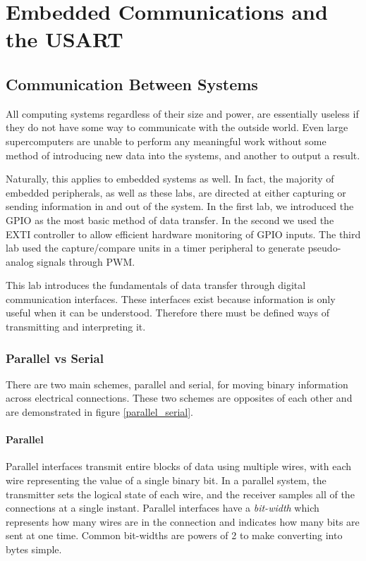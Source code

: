 \documentclass[11pt,fleqn]{book} %
\begin{document}
	
\chapter{Embedded Communications and the USART}

\section{Communication Between Systems}
All computing systems regardless of their size and power, are essentially useless if they do not have some way to communicate with the outside world. Even large supercomputers are unable to perform any meaningful work without some method of introducing new data into the systems, and another to output a result. 

Naturally, this applies to embedded systems as well. In fact, the majority of embedded peripherals, as well as these labs, are directed at either capturing or sending information in and out of the system. In the first lab, we introduced the GPIO as the most basic method of data transfer. In the second we used the EXTI controller to allow efficient hardware monitoring of GPIO inputs. The third lab used the capture/compare units in a timer peripheral to generate pseudo-analog signals through PWM. 

This lab introduces the fundamentals of data transfer through digital communication interfaces. These interfaces exist because information is only useful when it can be understood. Therefore there must be defined ways of transmitting and interpreting it.

\subsection{Parallel vs Serial}

There are two main schemes, parallel and serial, for moving binary information across electrical connections. These two schemes are opposites of each other and are demonstrated in figure \ref{parallel_serial}. 

\subsubsection{Parallel}
Parallel interfaces transmit entire blocks of data using multiple wires, with each wire representing the value of a single binary bit. In a parallel system, the transmitter sets the logical state of each wire, and the receiver samples all of the connections at a single instant. Parallel interfaces have a \textit{bit-width} which represents how many wires are in the connection and indicates how many bits are sent at one time. Common bit-widths are powers of 2 to make converting into bytes simple. 
\end{document}
